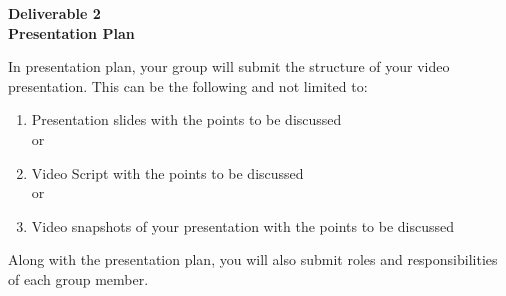 \documentclass[12pt]{article}
\begin{document}
\begin{center}
\textbf{\Large Deliverable 2 \\ Presentation Plan} 
\end{center}

In presentation plan, your group will submit the structure of your video presentation.
This can be the following and not limited to:
\begin{enumerate}
    \item Presentation slides with the points to be discussed \\
    or
    \item Video Script with the points to be discussed \\
    or
    \item Video snapshots of your presentation with the points to be discussed \\
\end{enumerate}


Along with the presentation plan, you will also submit roles and responsibilities of each group member. 
\end{document}
